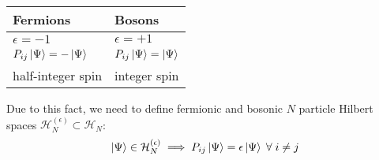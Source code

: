 \documentclass[../classnotes.tex]{subfiles}
\begin{document}
\begin{tabularx}{0.8\textwidth}{ >{\centering\arraybackslash}X | >{\centering\arraybackslash}X }
    Fermions & Bosons \\
    \hline
    \(\epsilon = -1\) & \(\epsilon = +1\) \\
    \(P_{ij} \ket{\Psi} = -\ket{\Psi}\) & \(P_{ij} \ket{\Psi} = \ket{\Psi}\) \\
    half-integer spin & integer spin
\end{tabularx}

Due to this fact, we need to define fermionic and bosonic \(N\) particle Hilbert spaces \(\mathcal{H}^{(\epsilon)}_N \subset \mathcal{H}_N\):
\begin{equation}
    \ket{\Psi} \in \mathcal{H}^{(\epsilon)}_N \implies P_{ij} \ket{\Psi} = \epsilon \ket{\Psi}\;\forall\; i \neq j
\end{equation}
\end{document}
